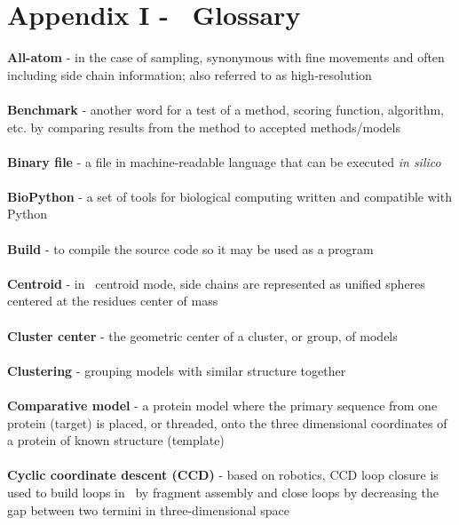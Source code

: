 \section{Appendix I - \rosetta~Glossary}
\label{sec:appI}
\singlespace
\setlength{\parindent}{0pt}

\textbf{All-atom} - in the case of sampling, synonymous with fine movements and often including side chain information; also referred to as high-resolution \\ \\

\textbf{Benchmark} - another word for a test of a method, scoring function, algorithm, etc. by comparing results from the method to accepted methods/models \\ \\

\textbf{Binary file} - a file in machine-readable language that can be executed \textit{in silico} \\ \\

\textbf{BioPython} - a set of tools for biological computing written and compatible with Python \\ \\

\textbf{Build} - to compile the source code so it may be used as a program \\ \\

\textbf{Centroid} - in \rosetta~centroid mode, side chains are represented as unified spheres centered at the residues center of mass \\ \\

\textbf{Cluster center} - the geometric center of a cluster, or group, of models \\ \\

\textbf{Clustering} -  grouping models with similar structure together \\ \\

\textbf{Comparative model} - a protein model where the primary sequence from one protein (target) is placed, or threaded, onto the three dimensional coordinates of a protein of known structure (template) \\ \\

\textbf{Cyclic coordinate descent (CCD)} - based on robotics, CCD loop closure is used to build loops in \rosetta~by fragment assembly and close loops by decreasing the gap between two termini in three-dimensional space \\ \\


